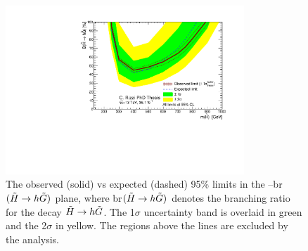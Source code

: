 \begin{figure}[htbp]
	\centering
	\includegraphics[width=0.8\textwidth]{figures/ewk_prod/interpretation/br_limit_HM.pdf}
	\caption{The observed (solid) vs expected (dashed) 95\% limits in the \mhino--\gls{br}$(\tilde{H}\rightarrow h \tilde{G})$ plane, where \gls{br}$(\tilde{H}\rightarrow h \tilde{G})$ denotes the branching ratio for the decay $\tilde{H} \rightarrow h \tilde{G}$. The 1$\sigma$ uncertainty band is overlaid in green and the 2$\sigma$ in yellow. The regions above the lines are excluded by the analysis.} 
	\label{fig:exclusion_high:BR}
\end{figure}

\FloatBarrier

